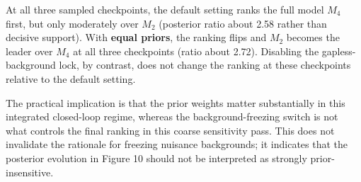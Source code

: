\documentclass[
]{article}
\begin{document}
At all three sampled checkpoints, the default setting ranks the full
model \(M_4\) first, but only moderately over \(M_2\) (posterior ratio
about 2.58 rather than decisive support). With \textbf{equal priors},
the ranking flips and \(M_2\) becomes the leader over \(M_4\) at all
three checkpoints (ratio about 2.72). Disabling the gapless-background
lock, by contrast, does not change the ranking at these checkpoints
relative to the default setting.

The practical implication is that the prior weights matter substantially
in this integrated closed-loop regime, whereas the background-freezing
switch is not what controls the final ranking in this coarse sensitivity
pass. This does not invalidate the rationale for freezing nuisance
backgrounds; it indicates that the posterior evolution in Figure 10
should not be interpreted as strongly prior-insensitive.
\end{document}
